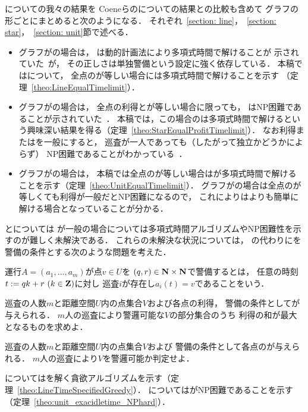 {\patProb}についての我々の結果を
Coeneらの{\independentPatProb}についての結果との比較も含めて
グラフの形ごとにまとめると次のようになる．
それぞれ~\ref{section: line}，~\ref{section: star}，~\ref{section: unit}節で述べる．
\begin{itemize}
\item 
  グラフが{\graphLine}の場合は，
  {\independentPatProb}は動的計画法により多項式時間で解けることが
  示されていた~\cite[Theorem~11]{coene2011charlemagne}が，
  その正しさは単独警備という設定に強く依存している．
  本稿では{\patProb}について，
  全点の{\maxIdletime}が等しい場合には多項式時間で解けることを示す
  （定理~\ref{theo:LineEqualTimelimit}）．
\item
  グラフが{\graphStar}の場合は，
  全点の利得と{\maxIdletime}が等しい場合に限っても，
  {\independentPatProb}はNP困難であることが示されていた~\cite[Theorem~10]{coene2011charlemagne}．
  本稿では，この場合の{\patProb}は多項式時間で解けるという興味深い結果を得る（定理~\ref{theo:StarEqualProfitTimelimit}）．
  なお利得または{\maxIdletime}を一般にすると，
  巡査が一人であっても（したがって独立かどうかによらず）
  NP困難であることがわかっている~\cite[Theorems 5 and 6]{coene2011charlemagne}．
\item 
  グラフが{\graphUnit}の場合は，
  本稿では全点の{\maxIdletime}が等しい場合は{\patProb}が多項式時間で解けることを示す（定理~\ref{theo:UnitEqualTimelimit}）．
  グラフが{\graphStar}の場合は全点の{\maxIdletime}が等しくても利得が一般だとNP困難になるので，
  これにより{\graphUnit}は{\graphStar}よりも簡単に解ける場合となっていることが分かる．
\end{itemize}


{\graphLine}と{\graphUnit}については
{\maxIdletime}が一般の場合については多項式時間アルゴリズムやNP困難性を示すのが難しく未解決である．
これらの未解決な状況については，
{\maxIdletime}の代わりに{\exactIdletime}を警備の条件とする次のような問題を考えた．

\begin{defi}
運行$A = (a _1, \ldots, a _m)$が点$v \in U$を
{\exactIdletime}$(q, r) \in \mathbf N \times \mathbf N$で警備するとは，
任意の時刻$t := q k + r\ (k \in \mathbf Z)$に対し
巡査$i$が存在し$a _i (t) = v$であることをいう．
\end{defi}

\begin{timeSpecifiedPatrollingProblem}
巡査の人数$m$と距離空間$U$内の点集合$V$および各点の利得，
警備の条件として{\exactIdletime}が与えられる．
$m$人の巡査により警邏可能な$V$の部分集合のうち
利得の和が最大となるものを求めよ．
\end{timeSpecifiedPatrollingProblem}

\begin{timeSpecifiedPatrollingProblemDecision}
巡査の人数$m$と距離空間$U$内の点集合$V$および
警備の条件として各点の{\exactIdletime}が与えられる．
$m$人の巡査により$V$を警邏可能か判定せよ．
\end{timeSpecifiedPatrollingProblemDecision}


{\graphLine}については{\timeSpecifiedPatProbDecision}を解く貪欲アルゴリズムを示す（定理~\ref{theo:LineTimeSpecifiedGreedy}）．
{\graphUnit}については{\timeSpecifiedPatProb}がNP困難であることを示す（定理~\ref{theo:unit_exacidletime_NPhard}）．
